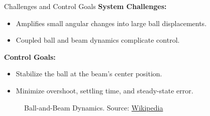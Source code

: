 \documentclass{beamer}
\begin{document}
\begin{frame}{Challenges and Control Goals}
        \textbf{\small System Challenges:}
        \begin{itemize}
	    \small
            \item Amplifies small angular changes into large ball displacements.
            \item Coupled ball and beam dynamics complicate control.
        \end{itemize}

        \textbf{\small Control Goals:}
        \begin{itemize}
	    \small
            \item Stabilize the ball at the beam's center position.
            \item Minimize overshoot, settling time, and steady-state error.
        \end{itemize}
        
        \centering
	\begin{figure}
	        \caption{Ball-and-Beam Dynamics. \tiny Source: \href{https://en.wikipedia.org/wiki/Ball_and_beam}{Wikipedia}}
	        \label{fig:ball_and_beam}
    	\end{figure}
\end{frame}
\end{document}
